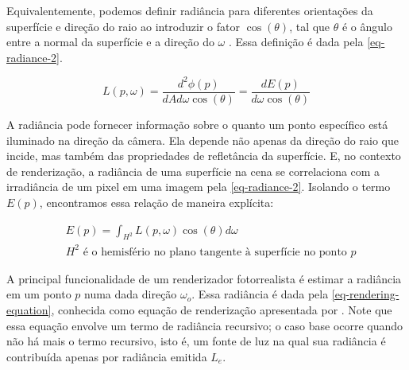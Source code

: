 \documentclass[english, 
               brazil, 
               bsc] %
               {dcomp-abntex2}
\begin{document}


Equivalentemente, podemos definir radiância para diferentes orientações da superfície e direção do raio ao introduzir o fator $\cos(\theta)$, tal que $\theta$ é o ângulo entre a normal da superfície e a direção do ${\omega}$ \cite[5.4.1]{pbr}. Essa definição é dada pela \autoref{eq-radiance-2}. 


\begin{equation} \label{eq-radiance-2}
  L(p,{\omega}) = \frac{d^2\phi(p)}{dAd{\omega} \cos(\theta)} = \frac{dE(p)}{d{\omega} \cos(\theta)} 
\end{equation}




A radiância pode fornecer informação sobre o quanto um ponto específico está iluminado na direção da câmera. Ela depende não apenas da direção do raio que incide, mas também das propriedades de refletância da superfície. E, no contexto de renderização, a radiância de uma superfície na cena se correlaciona com a irradiância de um pixel em uma imagem pela \autoref{eq-radiance-2}. Isolando o termo $E(p)$, encontramos essa relação de maneira explícita:


\begin{align*}
 \label{ep-Ep}
  &E(p) = \int_{H^2}{L(p,{\omega})\cos(\theta)d{\omega}}\\
  &H^2 \text{ é o hemisfério no plano tangente à superfície no ponto $p$}
\end{align*}




A principal funcionalidade de um renderizador fotorrealista é estimar a radiância em um ponto $p$ numa dada direção ${\omega}_o$. Essa radiância é dada pela \autoref{eq-rendering-equation}, conhecida como equação de renderização apresentada por \cite{rendering_equation}. Note que essa equação envolve um termo de radiância recursivo; o caso base ocorre quando não há mais o termo recursivo, isto é, um fonte de luz na qual sua radiância é contribuída apenas por radiância emitida $L_e$.
\end{document}
